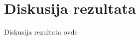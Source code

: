 \documentclass[a4paper,10pt]{article}
\begin{document}

\section{Diskusija rezultata}

Diskusija rezultata ovde






\end{document}
